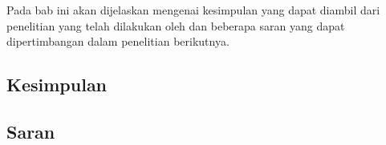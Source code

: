\chapter{\kesimpulan}
Pada bab ini akan dijelaskan mengenai kesimpulan yang dapat diambil dari
penelitian yang telah dilakukan oleh \saya dan beberapa saran yang dapat
dipertimbangan dalam penelitian berikutnya.

\section{Kesimpulan}


\section{Saran}

